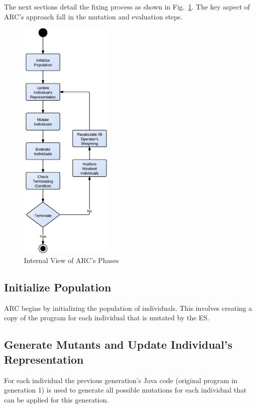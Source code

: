 \documentclass{llncs}
\begin{document}
The next sections detail the fixing process as shown in Fig.~\ref{fig:phases_internals}.
The key aspect of ARC's approach fall in the mutation and evaluation steps.

\begin{figure}[h]
  \centering
  \includegraphics[width=4.50cm]{figures/phases.pdf}
  \caption{Internal View of ARC's Phases}
  \label{fig:phases_internals}
\end{figure}

\subsection{Initialize Population}
\label{sec:initialize_population}

ARC begins by initializing the population of individuals. This
involves creating a copy of the program for each individual that is mutated by
the ES.

\subsection{Generate Mutants and Update Individual's Representation}
\label{sec:update_individual_representation}

For each individual the previous generation's Java code (original program in generation 1)
 is used to generate all
possible mutations for each individual that can be applied for this generation.
\end{document}

